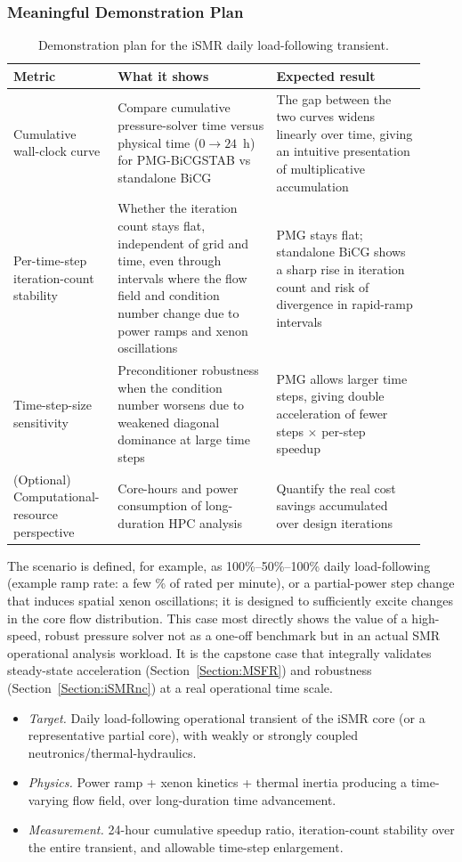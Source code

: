 \documentclass[review]{elsarticle}
\begin{document}
\subsubsection{Meaningful Demonstration Plan}
\begin{table}[H]
\centering
\caption{Demonstration plan for the iSMR daily load-following transient.}
\label{tab:demo-plan}
\begin{tabular}{p{0.22\linewidth} p{0.36\linewidth} p{0.34\linewidth}}
\toprule
\textbf{Metric} & \textbf{What it shows} & \textbf{Expected result} \\
\midrule
Cumulative wall-clock curve & Compare cumulative pressure-solver time versus physical time ($0 \to 24$~h) for PMG-BiCGSTAB vs standalone BiCG & The gap between the two curves widens linearly over time, giving an intuitive presentation of multiplicative accumulation \\
Per-time-step iteration-count stability & Whether the iteration count stays flat, independent of grid and time, even through intervals where the flow field and condition number change due to power ramps and xenon oscillations & PMG stays flat; standalone BiCG shows a sharp rise in iteration count and risk of divergence in rapid-ramp intervals \\
Time-step-size sensitivity & Preconditioner robustness when the condition number worsens due to weakened diagonal dominance at large time steps & PMG allows larger time steps, giving double acceleration of fewer steps $\times$ per-step speedup \\
(Optional) Computational-resource perspective & Core-hours and power consumption of long-duration HPC analysis & Quantify the real cost savings accumulated over design iterations \\
\bottomrule
\end{tabular}
\end{table}

The scenario is defined, for example, as 100\%--50\%--100\% daily load-following (example ramp rate: a few \% of rated per minute), or a partial-power step change that induces spatial xenon oscillations; it is designed to sufficiently excite changes in the core flow distribution. This case most directly shows the value of a high-speed, robust pressure solver not as a one-off benchmark but in an actual SMR operational analysis workload. It is the capstone case that integrally validates steady-state acceleration (Section~\ref{Section:MSFR}) and robustness (Section~\ref{Section:iSMRnc}) at a real operational time scale.
\begin{itemize}
  \item \emph{Target.} Daily load-following operational transient of the iSMR core (or a representative partial core), with weakly or strongly coupled neutronics/thermal-hydraulics.
  \item \emph{Physics.} Power ramp + xenon kinetics + thermal inertia producing a time-varying flow field, over long-duration time advancement.
  \item \emph{Measurement.} 24-hour cumulative speedup ratio, iteration-count stability over the entire transient, and allowable time-step enlargement.
\end{itemize}
\end{document}
